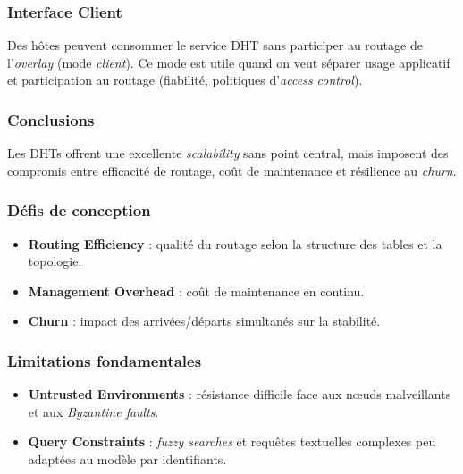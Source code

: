 \subsubsection*{Interface Client}
Des h\^otes peuvent consommer le service DHT sans participer au routage de l'\emph{overlay} (mode \emph{client}).
Ce mode est utile quand on veut s\'eparer usage applicatif et participation au routage (fiabilit\'e, politiques d'\emph{access control}).

\subsubsection{Conclusions}

Les DHTs offrent une excellente \emph{scalability} sans point central, mais imposent des compromis entre efficacit\'e de routage, co\^ut de maintenance et r\'esilience au \emph{churn}.

\subsubsection*{D\'efis de conception}
\begin{itemize}
\item \textbf{Routing Efficiency} : qualit\'e du routage selon la structure des tables et la topologie.
\item \textbf{Management Overhead} : co\^ut de maintenance en continu.
\item \textbf{Churn} : impact des arriv\'ees/d\'eparts simultan\'es sur la stabilit\'e.
\end{itemize}

\subsubsection*{Limitations fondamentales}
\begin{itemize}
\item \textbf{Untrusted Environments} : r\'esistance difficile face aux n\oe uds malveillants et aux \emph{Byzantine faults}.
\item \textbf{Query Constraints} : \emph{fuzzy searches} et requ\^etes textuelles complexes peu adapt\'ees au mod\`ele par identifiants.
\end{itemize}